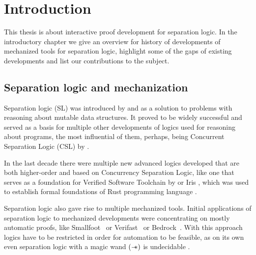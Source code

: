\chapter{Introduction}

This thesis is about interactive proof development for separation logic.
In the introductory chapter we give an overview for history of developments of mechanized tools for separation logic, highlight some of the gaps of existing developments and list our contributions to the subject.

\section{Separation logic and mechanization}
\label{sec:separation-logic-mechanization}

Separation logic (SL) was introduced by \citet{reynoldsSeparationLogicLogic2002} and
\citet{ohearnLocalReasoningPrograms2001} as a solution to problems with reasoning about mutable data structures.
It proved to be widely successful \cite{ohearnSeparationLogic2019} and served as a basis for multiple other developments of logics used for reasoning about programs, the most influential of them, perhaps, being Concurrent Separation Logic (CSL) by \citet{ohearnResourcesConcurrencyLocal2007}.

In the last decade there were multiple new advanced logics developed that are both higher-order and based on Concurrency Separation Logic, like one that serves as a foundation for Verified Software Toolchain by \citet{appelProgramLogicsCertified2014} or Iris \cite{jungIrisGroundModular2018}, which was used to establish formal foundations of Rust programming language \cite{jungRustBeltSecuringFoundations2018}.

Separation logic also gave rise to multiple mechanized tools.
Initial applications of separation logic to mechanized developments were concentrating on mostly automatic proofs, like Smallfoot~\cite{berdineSmallfootModularAutomatic2006} or Verifast~\cite{jacobsVeriFastProgramVerifier2008} or Bedrock~\cite{chlipalaMostlyautomatedVerificationLowlevel2011, chlipalaBedrockStructuredProgramming2013}.
With this approach logics have to be restricted in order for automation to be feasible, as on its own even separation logic with a magic wand \((\mathrel{-\mkern-6mu*})\) is undecidable \cite{brotherstonUndecidabilityPropositionalSeparation2014}.


